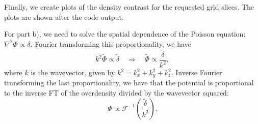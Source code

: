 \documentclass{article}
\begin{document}
Finally, we create plots of the density contrast for the requested grid slices. The plots are shown after the code output.

For part b), we need to solve the spatial dependence of the Poisson equation: $\nabla^2 \Phi \propto \delta$. Fourier transforming this proportionality, we have
\begin{equation}
    k^2 \tilde{\Phi} \propto \tilde{\delta} \quad \Rightarrow \quad  \tilde{\Phi} \propto \frac{\tilde{\delta}}{k^2},
\end{equation}
where $k$ is the wavevector, given by $k^2 = k_x^2 + k_y^2 + k_z^2$. Inverse Fourier transforming the last proportionality, we have that the potential is proportional to the inverse FT of the overdensity divided by the wavevector squared:
\begin{equation}
    \Phi \propto \mathcal{F}^{-1}\left(\frac{\tilde{\delta}}{k^2}\right).
\end{equation}
\end{document}
